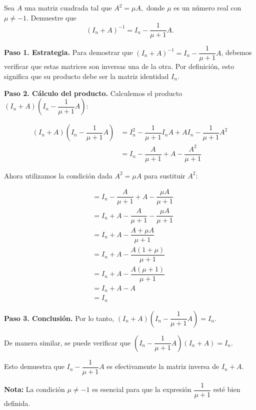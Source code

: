 \begin{prob} 
Sea $A$ una matriz cuadrada tal que $A^{2}=\mu A,$ donde $\mu$ es un número real con $\mu \neq -1.$ Demuestre que 
$$\left( I_{n}+A \right)^{-1}=I_{n}-\dfrac{1}{\mu +1}A.$$

\begin{myproof}
\textbf{Paso 1. Estrategia.} Para demostrar que $\left( I_{n}+A \right)^{-1}=I_{n}-\dfrac{1}{\mu +1}A$, debemos verificar que estas matrices son inversas una de la otra. Por definición, esto significa que su producto debe ser la matriz identidad $I_{n}$.

\textbf{Paso 2. Cálculo del producto.} Calculemos el producto $\left( I_{n}+A \right)\left( I_{n}-\dfrac{1}{\mu +1}A\right)$:

\begin{align*}
\left( I_{n}+A \right)\left( I_{n}-\dfrac{1}{\mu +1}A\right) &= I_{n}^{2} - \dfrac{1}{\mu +1}I_{n}A + AI_{n} - \dfrac{1}{\mu +1}A^2\\
&= I_{n} - \dfrac{A}{\mu +1} + A - \dfrac{A^2}{\mu +1}
\end{align*}

Ahora utilizamos la condición dada $A^{2} = \mu A$ para sustituir $A^2$:

\begin{align*}
&= I_{n} - \dfrac{A}{\mu +1} + A - \dfrac{\mu A}{\mu +1}\\
&= I_{n} + A - \dfrac{A}{\mu +1} - \dfrac{\mu A}{\mu +1}\\
&= I_{n} + A - \dfrac{A + \mu A}{\mu +1}\\
&= I_{n} + A - \dfrac{A(1 + \mu)}{\mu +1}\\
&= I_{n} + A - \dfrac{A(\mu + 1)}{\mu +1}\\
&= I_{n} + A - A\\
&= I_{n}
\end{align*}

\textbf{Paso 3. Conclusión.} Por lo tanto, $\left( I_{n}+A \right)\left( I_{n}-\dfrac{1}{\mu +1}A\right) = I_{n}$.

De manera similar, se puede verificar que $\left( I_{n}-\dfrac{1}{\mu +1}A\right)\left( I_{n}+A \right) = I_{n}$.

Esto demuestra que $I_{n}-\dfrac{1}{\mu +1}A$ es efectivamente la matriz inversa de $I_{n}+A$.

\textbf{Nota:} La condición $\mu \neq -1$ es esencial para que la expresión $\dfrac{1}{\mu +1}$ esté bien definida.

\end{myproof}
\end{prob}


